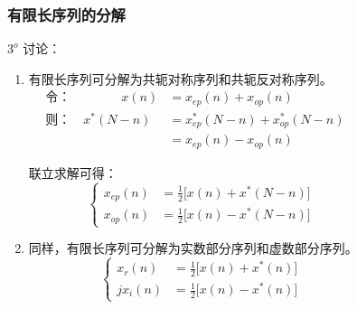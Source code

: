 \documentclass[notheorems,compress,mathserif,table]{beamer}
\begin{document}
\begin{frame}[allowframebreaks]\frametitle{ 有限长序列的分解}%
$3^o$ 讨论：
\begin{enumerate}
  \item 有限长序列可分解为共轭对称序列和共轭反对称序列。
\begin{equation*}
        \begin{split}
        \mbox{令} ： \quad\quad\quad\quad x(n)  &=  x_{ep}(n) + x_{op}(n)   \\
        \mbox{则} ： \quad   x^*(N-n)           &= x_{ep}^*(N-n) + x_{op}^*(N-n)  \quad\quad\quad\quad\quad\quad\quad\quad  \\
                                                &= x_{ep}(n) - x_{op}(n)
        \end{split}
        \end{equation*}

        联立求解可得：
        \begin{equation*} %
        \left\{ \begin{aligned}
            x_{ep}(n) &= \frac{1}{2}\big[x(n) + x^{*}(N-n)\big]  \quad\quad\quad\quad\quad\quad\quad\\
            x_{op}(n) &= \frac{1}{2}\big[x(n) - x^{*}(N-n)\big]
        \end{aligned} \right.
        \end{equation*}
\newpage        
        
\item 同样，有限长序列可分解为实数部分序列和虚数部分序列。
        \begin{equation*} %
        \left\{ \begin{aligned}
            x_{r}(n)  &= \frac{1}{2}\big[x(n) + x^{*}(n)\big]   \quad\quad\quad\quad\quad\quad\quad\\
            jx_{i}(n) &= \frac{1}{2}\big[x(n) - x^{*}(n)\big]
        \end{aligned} \right.
        \end{equation*}
\end{enumerate}        
\end{frame}



%
%
%
\end{document}
